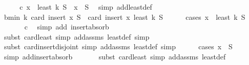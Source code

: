 \begin{isabellebody}
%
\isadelimproof
%
\endisadelimproof
%
\isatagproof
{}\isamarkupfalse%
\ {\isacharminus}{\kern0pt}\isanewline
\ \ \isamarkupfalse%
\ c{\isacharcolon}{\kern0pt}\ {\isachardoublequoteopen}x\ {\isasymin}\ least\ k\ S\ {\isasymLongrightarrow}\ x\ {\isasymin}\ S{\isachardoublequoteclose}\ \isamarkupfalse%
\ {\isacharparenleft}{\kern0pt}simp\ add{\isacharcolon}{\kern0pt}least{\isacharunderscore}{\kern0pt}def{\isacharparenright}{\kern0pt}\isanewline
\ \ \isamarkupfalse%
\ b{\isacharcolon}{\kern0pt}{\isachardoublequoteopen}min\ k\ {\isacharparenleft}{\kern0pt}card\ {\isacharparenleft}{\kern0pt}insert\ x\ S{\isacharparenright}{\kern0pt}{\isacharparenright}{\kern0pt}\ {\isasymle}\ card\ {\isacharparenleft}{\kern0pt}insert\ x\ {\isacharparenleft}{\kern0pt}least\ k\ S{\isacharparenright}{\kern0pt}{\isacharparenright}{\kern0pt}{\isachardoublequoteclose}\isanewline
\ \ \ \ \isamarkupfalse%
\ {\isacharparenleft}{\kern0pt}cases\ {\isachardoublequoteopen}x\ {\isasymin}\ least\ k\ S{\isachardoublequoteclose}{\isacharparenright}{\kern0pt}\isanewline
\ \ \ \ \ \isamarkupfalse%
\ c\ \isamarkupfalse%
\ {\isacharparenleft}{\kern0pt}simp\ add{\isacharcolon}{\kern0pt}\ insert{\isacharunderscore}{\kern0pt}absorb{\isacharparenright}{\kern0pt}\isanewline
\ \ \ \ \ \isamarkupfalse%
\ {\isacharparenleft}{\kern0pt}subst\ card{\isacharunderscore}{\kern0pt}least{\isacharcomma}{\kern0pt}\ simp\ add{\isacharcolon}{\kern0pt}assms\ least{\isacharunderscore}{\kern0pt}def{\isacharcomma}{\kern0pt}\ simp{\isacharparenright}{\kern0pt}\isanewline
\ \ \ \ \isamarkupfalse%
\ {\isacharparenleft}{\kern0pt}subst\ card{\isacharunderscore}{\kern0pt}insert{\isacharunderscore}{\kern0pt}disjoint{\isacharcomma}{\kern0pt}\ simp\ add{\isacharcolon}{\kern0pt}assms\ least{\isacharunderscore}{\kern0pt}def{\isacharcomma}{\kern0pt}\ simp{\isacharparenright}{\kern0pt}\isanewline
\ \ \ \ \isamarkupfalse%
\ {\isacharparenleft}{\kern0pt}cases\ {\isachardoublequoteopen}x\ {\isasymin}\ S{\isachardoublequoteclose}{\isacharparenright}{\kern0pt}\isanewline
\ \ \ \ \ \isamarkupfalse%
\ {\isacharparenleft}{\kern0pt}simp\ add{\isacharcolon}{\kern0pt}insert{\isacharunderscore}{\kern0pt}absorb{\isacharparenright}{\kern0pt}\isanewline
\ \ \ \ \ \isamarkupfalse%
\ {\isacharparenleft}{\kern0pt}subst\ card{\isacharunderscore}{\kern0pt}least{\isacharcomma}{\kern0pt}\ simp\ add{\isacharcolon}{\kern0pt}assms\ least{\isacharunderscore}{\kern0pt}def{\isacharparenright}{\kern0pt}\isanewline

\end{isabellebody}
